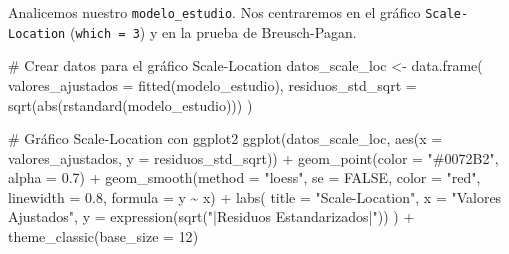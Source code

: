 \documentclass[
  letterpaper,
  DIV=11,
  numbers=noendperiod]{scrreprt}
\newenvironment{Shaded}{\begin{snugshade}}{\end{snugshade}}
\newcommand{\AttributeTok}[1]{\textcolor[rgb]{0.40,0.45,0.13}{#1}}
\newcommand{\CommentTok}[1]{\textcolor[rgb]{0.37,0.37,0.37}{#1}}
\newcommand{\ConstantTok}[1]{\textcolor[rgb]{0.56,0.35,0.01}{#1}}
\newcommand{\DecValTok}[1]{\textcolor[rgb]{0.68,0.00,0.00}{#1}}
\newcommand{\FloatTok}[1]{\textcolor[rgb]{0.68,0.00,0.00}{#1}}
\newcommand{\FunctionTok}[1]{\textcolor[rgb]{0.28,0.35,0.67}{#1}}
\newcommand{\NormalTok}[1]{\textcolor[rgb]{0.00,0.23,0.31}{#1}}
\newcommand{\OtherTok}[1]{\textcolor[rgb]{0.00,0.23,0.31}{#1}}
\newcommand{\SpecialCharTok}[1]{\textcolor[rgb]{0.37,0.37,0.37}{#1}}
\newcommand{\StringTok}[1]{\textcolor[rgb]{0.13,0.47,0.30}{#1}}
\begin{document}
\begin{tcolorbox}[enhanced jigsaw, breakable, toprule=.15mm, bottomtitle=1mm, coltitle=black, colbacktitle=quarto-callout-tip-color!10!white, titlerule=0mm, opacitybacktitle=0.6, bottomrule=.15mm, toptitle=1mm, title=\textcolor{quarto-callout-tip-color}{\faLightbulb}\hspace{0.5em}{Ejemplo de un modelo válido}, arc=.35mm, rightrule=.15mm, opacityback=0, colframe=quarto-callout-tip-color-frame, leftrule=.75mm, left=2mm, colback=white]

Analicemos nuestro \texttt{modelo\_estudio}. Nos centraremos en el
gráfico \texttt{Scale-Location} (\texttt{which\ =\ 3}) y en la prueba de
Breusch-Pagan.

\begin{Shaded}
\begin{Highlighting}[]
\CommentTok{\# Crear datos para el gráfico Scale{-}Location}
\NormalTok{datos\_scale\_loc }\OtherTok{\textless{}{-}} \FunctionTok{data.frame}\NormalTok{(}
  \AttributeTok{valores\_ajustados =} \FunctionTok{fitted}\NormalTok{(modelo\_estudio),}
  \AttributeTok{residuos\_std\_sqrt =} \FunctionTok{sqrt}\NormalTok{(}\FunctionTok{abs}\NormalTok{(}\FunctionTok{rstandard}\NormalTok{(modelo\_estudio)))}
\NormalTok{)}

\CommentTok{\# Gráfico Scale{-}Location con ggplot2}
\FunctionTok{ggplot}\NormalTok{(datos\_scale\_loc, }\FunctionTok{aes}\NormalTok{(}\AttributeTok{x =}\NormalTok{ valores\_ajustados, }\AttributeTok{y =}\NormalTok{ residuos\_std\_sqrt)) }\SpecialCharTok{+}
  \FunctionTok{geom\_point}\NormalTok{(}\AttributeTok{color =} \StringTok{"\#0072B2"}\NormalTok{, }\AttributeTok{alpha =} \FloatTok{0.7}\NormalTok{) }\SpecialCharTok{+}
  \FunctionTok{geom\_smooth}\NormalTok{(}\AttributeTok{method =} \StringTok{"loess"}\NormalTok{, }\AttributeTok{se =} \ConstantTok{FALSE}\NormalTok{, }\AttributeTok{color =} \StringTok{"red"}\NormalTok{, }\AttributeTok{linewidth =} \FloatTok{0.8}\NormalTok{, }\AttributeTok{formula =}\NormalTok{ y }\SpecialCharTok{\textasciitilde{}}\NormalTok{ x) }\SpecialCharTok{+}
  \FunctionTok{labs}\NormalTok{(}
    \AttributeTok{title =} \StringTok{"Scale{-}Location"}\NormalTok{,}
    \AttributeTok{x =} \StringTok{"Valores Ajustados"}\NormalTok{,}
    \AttributeTok{y =} \FunctionTok{expression}\NormalTok{(}\FunctionTok{sqrt}\NormalTok{(}\StringTok{"|Residuos Estandarizados|"}\NormalTok{))}
\NormalTok{  ) }\SpecialCharTok{+}
  \FunctionTok{theme\_classic}\NormalTok{(}\AttributeTok{base\_size =} \DecValTok{12}\NormalTok{)}


\end{Highlighting}
\end{Shaded}
\end{tcolorbox}
\end{document}
